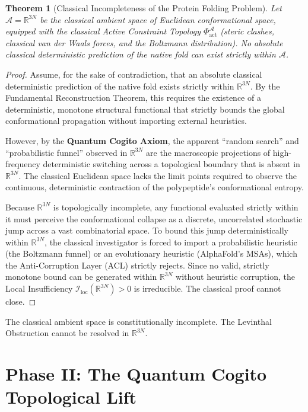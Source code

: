 \documentclass[11pt,openany]{extbook}
\theoremstyle{plain}
\newtheorem{theorem}{Theorem}[chapter]
\theoremstyle{definition}
\begin{document}
\begin{theorem}[Classical Incompleteness of the Protein Folding Problem]
Let $\mathcal{A} = \mathbb{R}^{3N}$ be the classical ambient space of Euclidean conformational space, equipped with the classical Active Constraint Topology $\Phi_{\mathrm{act}}^{\mathcal{A}}$ (steric clashes, classical van der Waals forces, and the Boltzmann distribution). No absolute classical deterministic prediction of the native fold can exist strictly within $\mathcal{A}$.
\end{theorem}

\begin{proof}
Assume, for the sake of contradiction, that an absolute classical deterministic prediction of the native fold exists strictly within $\mathbb{R}^{3N}$. By the Fundamental Reconstruction Theorem, this requires the existence of a deterministic, monotone structural functional that strictly bounds the global conformational propagation without importing external heuristics.

However, by the \textbf{Quantum Cogito Axiom}, the apparent ``random search'' and ``probabilistic funnel'' observed in $\mathbb{R}^{3N}$ are the macroscopic projections of high-frequency deterministic switching across a topological boundary that is absent in $\mathbb{R}^{3N}$. The classical Euclidean space lacks the limit points required to observe the continuous, deterministic contraction of the polypeptide's conformational entropy.

Because $\mathbb{R}^{3N}$ is topologically incomplete, any functional evaluated strictly within it must perceive the conformational collapse as a discrete, uncorrelated stochastic jump across a vast combinatorial space. To bound this jump deterministically within $\mathbb{R}^{3N}$, the classical investigator is forced to import a probabilistic heuristic (the Boltzmann funnel) or an evolutionary heuristic (AlphaFold's MSAs), which the Anti-Corruption Layer (ACL) strictly rejects. Since no valid, strictly monotone bound can be generated within $\mathbb{R}^{3N}$ without heuristic corruption, the Local Insufficiency $\mathcal{I}_{\mathrm{loc}}(\mathbb{R}^{3N}) > 0$ is irreducible. The classical proof cannot close.
\end{proof}

The classical ambient space is constitutionally incomplete. The Levinthal Obstruction cannot be resolved in $\mathbb{R}^{3N}$.

\section{Phase II: The Quantum Cogito Topological Lift}
\end{document}
